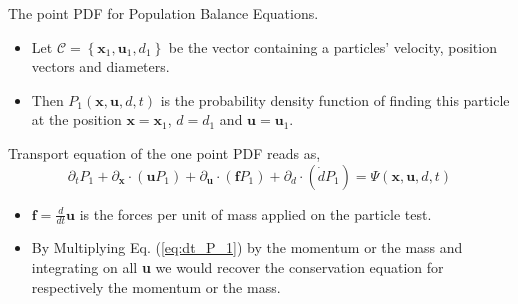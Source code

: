\documentclass{sintefbeamer}
\newcommand{\ddt}{\frac{d}{d t}}
\newcommand{\pddt}{\partial_t}
\begin{document}
\begin{frame}{The point PDF for Population Balance Equations.}
  \begin{definition}
    \begin{itemize}
      \item Let $\mathscr{C} =\left\{\textbf{x}_1,\textbf{u}_1,d_1\right\}$ be the vector containing a  particles' velocity, position vectors and diameters. 
      \item Then $P_1(\textbf{x},\textbf{u},d,t)$ is the probability density function of finding this particle at the position $\textbf{x} = \textbf{x}_1$, $d = d_1$ and $\textbf{u} = \textbf{u}_1$.  
    \end{itemize}
  \end{definition}
  Transport equation of the one point PDF reads as,
  \begin{equation}
    \pddt P_1
    + \partial_{\textbf{x}} \cdot
    (\textbf{u}P_1)
    + \partial_{\textbf{u}} \cdot
    (\textbf{f}P_1)
    + \partial_{d} \cdot
    (\dot{d} P_1)
    = \Psi(\textbf{x},\textbf{u},d,t)
    \label{eq:dt_P_1}
\end{equation}

  \begin{itemize}
    \item $\textbf{f} = \ddt \textbf{u}$ is the forces per unit of mass applied on the particle test. 
    \item By Multiplying Eq. (\ref{eq:dt_P_1}) by the momentum or the mass and integrating on all \textbf{u} we would recover the conservation equation for respectively the momentum or the mass. 
  \end{itemize}
\end{frame}
\end{document}
